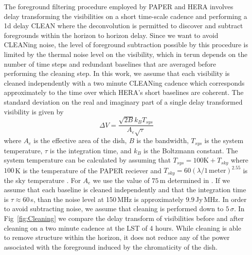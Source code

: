 \documentclass[twocolumn]{emulateapj}
\begin{document}
The foreground filtering procedure employed by PAPER and HERA involves delay transforming the visibilities on a short time-scale cadence and performing a 1d delay CLEAN where the deconvolution is permitted to discover and subtract foregrounds within the horizon to horizon delay. Since we want to avoid CLEANing noise, the level of foreground subtraction possible by this procedure is limited by the thermal noise level on the visibility, which in terun depends on the number of time steps and redundant baselines that are averaged before performing the cleaning step. In this work, we assume that each visibility is cleaned independently with a two minute CLEANing cadence which corresponds approximately to the time over which HERA's short baselines are coherent. The standard deviation on the real and imaginary part of a single delay transformed visibility is given by \citep{Morales:2004}
\begin{equation}
\Delta V = \frac{\sqrt{2 B} k_B T_{sys}}{A_e \sqrt{\tau}}
\end{equation}
where $A_e$ is the effective area of the dish, $B$ is the bandwidth, $T_{sys}$ is the system temperature, $\tau$ is the integration time, and $k_B$ is the Boltzmann constant. The system temperature can be calculated by assuming that $T_{sys} = 100\text{K} + T_{sky}$ where $100$\,K is the temperature of the PAPER reciever and $T_{sky} = 60 (\lambda/1\,\text{meter} )^{2.55}$ is the sky temperature \citep{Fixsen:2011}. For $A_e$ we use the value of $75$\,m determined in \citep{Neben:2016}. If we assume that each baseline is cleaned independently and that the integration time is $\tau \approx 60$\,s, than the noise level at 150\,MHz is approximately $9.9$\,Jy\,MHz. In order to avoid subtracting noise, we assume that cleaning is performed down to $5\,\sigma$. In Fig~\ref{fig:Cleaning} we compare the delay transform of visibilities before and after cleaning on a two minute cadence at the LST of 4 hours. While cleaning is able to remove structure within the horizon, it does not reduce any of the power associated with the foreground induced by the chromaticity of the dish. 
\end{document}
